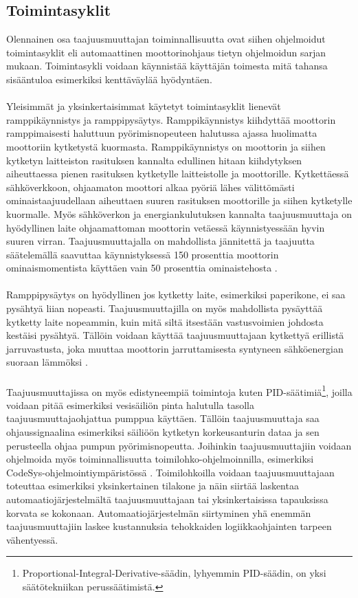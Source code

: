 \documentclass[finnish,12pt,a4paper,pdftex,elec,utf8]{aaltothesis}
\begin{document}

\subsection{Toimintasyklit}
Olennainen osa taajuusmuuttajan toiminnallisuutta ovat siihen ohjelmoidut toimintasyklit eli automaattinen moottorinohjaus tietyn ohjelmoidun sarjan mukaan. Toimintasykli voidaan käynnistää käyttäjän toimesta mitä tahansa sisääntuloa esimerkiksi kenttäväylää hyödyntäen. \cite{ABBtechnicalguide}
\\\\
Yleisimmät ja yksinkertaisimmat käytetyt toimintasyklit lienevät ramppikäynnistys ja ramppipysäytys. Ramppikäynnistys kiihdyttää moottorin ramppimaisesti haluttuun pyörimisnopeuteen halutussa ajassa huolimatta moottoriin kytketystä kuormasta.
Ramppikäynnistys on moottorin ja siihen kytketyn laitteiston rasituksen kannalta edullinen hitaan kiihdytyksen aiheuttaessa pienen rasituksen kytketylle laitteistolle ja moottorille. Kytkettäessä sähköverkkoon, ohjaamaton moottori alkaa pyöriä lähes välittömästi ominaistaajuudellaan aiheuttaen suuren rasituksen moottorille ja siihen kytketylle kuormalle. Myös sähköverkon ja energiankulutuksen kannalta taajuusmuuttaja on hyödyllinen laite ohjaamattoman moottorin vetäessä käynnistyessään hyvin suuren virran. Taajuusmuuttajalla on mahdollista jännitettä ja taajuutta säätelemällä saavuttaa käynnistyksessä 150 prosenttia moottorin ominaismomentista käyttäen vain 50 prosenttia ominaistehosta \cite{ABBtechnicalguide}.
\\\\
Ramppipysäytys on hyödyllinen jos kytketty laite, esimerkiksi paperikone, ei saa pysähtyä liian nopeasti. Taajuusmuuttajilla on myös mahdollista pysäyttää kytketty laite nopeammin, kuin mitä siltä itsestään vastusvoimien johdosta kestäisi pysähtyä. Tällöin voidaan käyttää taajuusmuuttajaan kytkettyä erillistä jarruvastusta, joka muuttaa moottorin jarruttamisesta syntyneen sähköenergian suoraan lämmöksi \cite{ABBtechnicalguide}.
\\\\
Taajuusmuuttajissa on myös edistyneempiä toimintoja kuten PID-säätimiä\footnote{Proportional-Integral-Derivative-säädin, lyhyemmin PID-säädin, on yksi säätötekniikan perussäätimistä.}, joilla voidaan pitää esimerkiksi vesisäiliön pinta halutulla tasolla taajuusmuuttajaohjattua pumppua käyttäen. Tällöin taajuusmuuttaja saa ohjaussignaalina esimerkiksi säiliöön kytketyn korkeusanturin dataa ja sen perusteella ohjaa pumpun pyörimisnopeutta. Joihinkin taajuusmuuttajiin voidaan ohjelmoida myös toiminnallisuutta toimilohko-ohjelmoinnilla, esimerkiksi CodeSys-ohjelmointiympäristössä \cite{MyyntiHaastattelu}. Toimilohkoilla voidaan taajuusmuuttajaan toteuttaa esimerkiksi yksinkertainen tilakone ja näin siirtää laskentaa automaatiojärjestelmältä taajuusmuuttajaan tai yksinkertaisissa tapauksissa korvata se kokonaan. Automaatiojärjestelmän siirtyminen yhä enemmän taajuusmuuttajiin laskee kustannuksia tehokkaiden logiikkaohjainten tarpeen vähentyessä.
\end{document}
